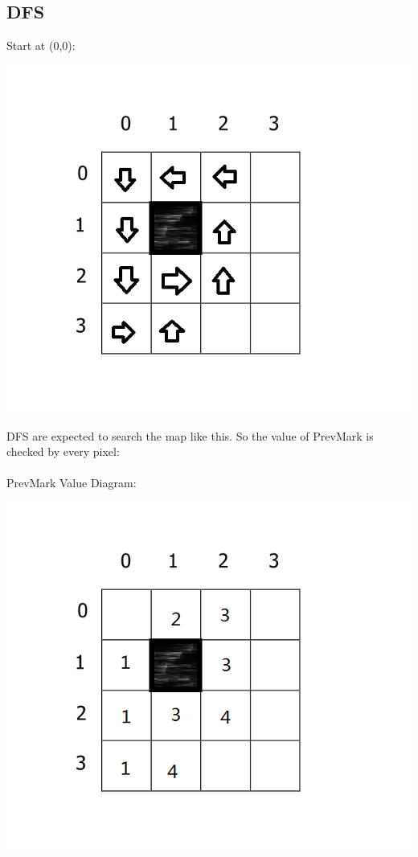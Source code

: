 \documentclass[11pt, a4paper]{report}
\begin{document}
\subsection{DFS}
Start at (0,0):
\begin{center}
\includegraphics[scale=0.4]{./image/Test2DFS.png}
\end{center}
DFS are expected to search the map like this. So the value of PrevMark is checked by every pixel:\\

\paragraph{}PrevMark Value Diagram:
\begin{center}
\includegraphics[scale=0.4]{./image/Test2DFSP.png}
\end{center}
\end{document}
